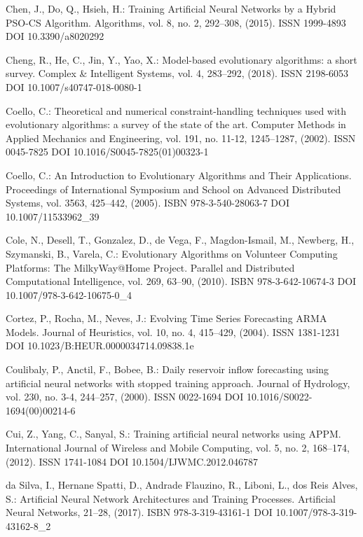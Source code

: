 \begin{thebibliography}{99.}
 Chen, J., Do, Q., Hsieh, H.: Training Artificial Neural Networks by a Hybrid PSO-CS Algorithm. Algorithms, vol. 8, no. 2, 292--308, (2015). ISSN 1999-4893 DOI 10.3390/a8020292

 Cheng, R., He, C., Jin, Y., Yao, X.: Model-based evolutionary algorithms: a short survey. Complex \& Intelligent Systems, vol. 4, 283--292, (2018). ISSN 2198-6053 DOI 10.1007/s40747-018-0080-1

 Coello, C.: Theoretical and numerical constraint-handling techniques used with evolutionary algorithms: a survey of the state of the art. Computer Methods in Applied Mechanics and Engineering, vol. 191, no. 11-12, 1245--1287, (2002). ISSN 0045-7825 DOI 10.1016/S0045-7825(01)00323-1

 Coello, C.: An Introduction to Evolutionary Algorithms and Their Applications. Proceedings of International Symposium and School on Advanced Distributed Systems, vol. 3563, 425--442, (2005). ISBN 978-3-540-28063-7 DOI 10.1007/11533962\_39

 Cole, N., Desell, T., Gonzalez, D., de Vega, F., Magdon-Ismail, M., Newberg, H., Szymanski, B., Varela, C.:  Evolutionary Algorithms on Volunteer Computing Platforms: The MilkyWay@Home Project. Parallel and Distributed Computational Intelligence, vol. 269, 63--90, (2010). ISBN 978-3-642-10674-3 DOI 10.1007/978-3-642-10675-0\_4

 Cortez, P., Rocha, M., Neves, J.: Evolving Time Series Forecasting ARMA Models. Journal of Heuristics, vol. 10, no. 4, 415--429, (2004). ISSN 1381-1231 DOI 10.1023/B:HEUR.0000034714.09838.1e

 Coulibaly, P., Anctil, F., Bobee, B.: Daily reservoir inflow forecasting using artificial neural networks with stopped training approach. Journal of Hydrology, vol. 230, no. 3-4, 244--257, (2000). ISSN 0022-1694 DOI 10.1016/S0022-1694(00)00214-6

 Cui, Z., Yang, C., Sanyal, S.: Training artificial neural networks using APPM. International Journal of Wireless and Mobile Computing, vol. 5, no. 2, 168--174, (2012). ISSN 1741-1084 DOI 10.1504/IJWMC.2012.046787

 da Silva, I., Hernane Spatti, D., Andrade Flauzino, R., Liboni, L., dos Reis Alves, S.: Artificial Neural Network Architectures and Training Processes. Artificial Neural Networks, 21--28, (2017). ISBN 978-3-319-43161-1 DOI 10.1007/978-3-319-43162-8\_2


\end{thebibliography}
